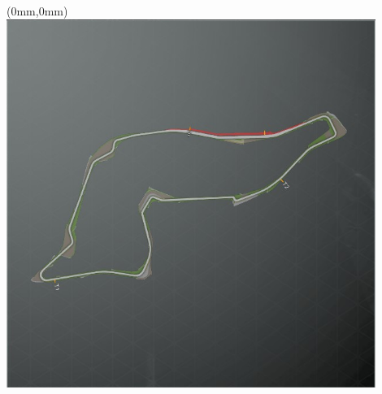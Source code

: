\null\newpage
\begin{textblock*}{30mm}(0mm,0mm)%
\includegraphics[width=120mm]{TR/2015-05-20_00030.png}
\end{textblock*}
